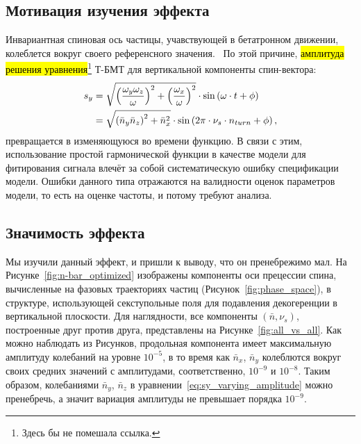 
\subsection{Мотивация изучения эффекта}
Инвариантная спиновая ось частицы, учавствующей в бетатронном движении, колеблется вокруг своего референсного значения.~\cite[стр.~11]{Shatunov} По этой причине, \hl{амплитуда решения уравнения}\footnote{Здесь бы не помешала ссылка.} Т-БМТ для вертикальной компоненты спин-вектора:
\begin{align}
s_y &= \sqrt{\bkt{\frac{\w_y\w_z}{\w}}^2 + \bkt{\frac{\w_x}{\w}}^2}\cdot\sin\bkt{\w\cdot t + \phi}\notag\\
&= \sqrt{\bkt{\bar n_y\bar n_z}^2 + \bar n_x^2} \cdot \sin\bkt{2\pi\cdot\nu_s\cdot n_{turn} + \phi},\label{eq:sy_varying_amplitude}
\end{align}
превращается в изменяющуюся во времени функцию. В связи с этим, использование простой гармонической функции в качестве модели для фитирования сигнала влечёт за собой систематическую ошибку спецификации модели. Ошибки данного типа отражаются на валидности оценок параметров модели, то есть на оценке частоты, и потому требуют анализа.

\subsection{Значимость эффекта}
Мы изучили данный эффект, и пришли к выводу, что он пренебрежимо мал. На Рисунке~\ref{fig:n-bar_optimized} изображены компоненты оси прецессии спина, вычисленные на фазовых траекториях частиц (Рисунок~\ref{fig:phase_space}), в структуре, использующей секступольные поля для подавления декогеренции в вертикальной плоскости. Для наглядности, все компоненты $(\bar n, \nu_s)$, построенные друг против друга, представлены на Рисунке~\ref{fig:all_vs_all}. Как можно наблюдать из Рисунков, продольная компонента имеет максимальную амплитуду колебаний на уровне $10^{-5}$, в то время как $\bar n_x$, $\bar n_y$ колеблются вокруг своих средних значений с амплитудами, соответственно, $10^{-9}$ и $10^{-8}$. Таким образом, колебаниями $\bar n_y$, $\bar n_z$ в уравнении~\eqref{eq:sy_varying_amplitude} можно пренебречь, а значит вариация амплитуды не превышает порядка $10^{-9}$.

